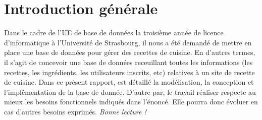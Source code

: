 \chapter*{Introduction générale}
Dans le cadre de l’UE de base de données la troisième année de licence
d’informatique à l’Université de Strasbourg, il nous a été demandé de mettre en place une base de données pour gérer des recettes de cuisine. En d'autres termes, il s'agit de concevoir une base de données receuillant toutes les informations (les recettes, les ingrédients, les utilisateurs inscrits, etc) relatives à un site de recette de cuisine.
\newline
Dans ce présent rapport, est détaillé la modélisation, la conception et l'implémentation de la base de donnée.
\newline
D'autre par, le travail réaliser respecte au mieux les besoins fonctionnels indiqués dans l'énoncé. Elle pourra donc évoluer en cas d'autres besoins exprimés.
\newline
\textit{Bonne lecture !}